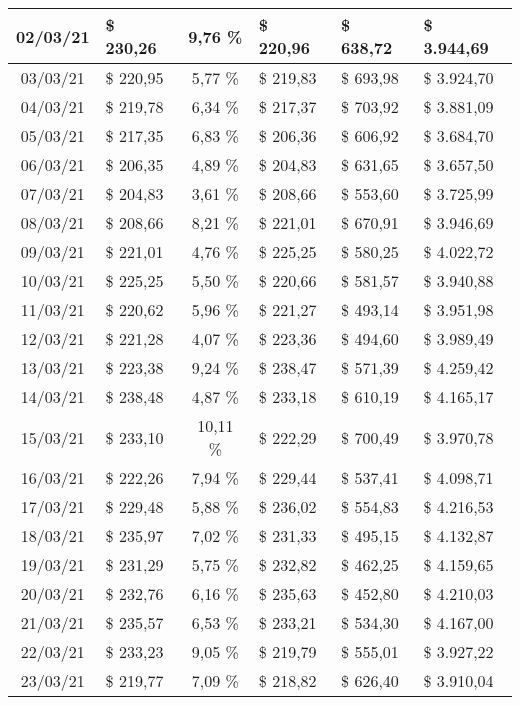 \begin{center}
\begin{small}
\begin{longtable}{|c|l|c|l|l|l|}
02/03/21 & \$ 230,26 & 9,76 \% & \$ 220,96 & \$ 638,72 & \$ 3.944,69 \\ \hline
03/03/21 & \$ 220,95 & 5,77 \% & \$ 219,83 & \$ 693,98 & \$ 3.924,70 \\ \hline
04/03/21 & \$ 219,78 & 6,34 \% & \$ 217,37 & \$ 703,92 & \$ 3.881,09 \\ \hline
05/03/21 & \$ 217,35 & 6,83 \% & \$ 206,36 & \$ 606,92 & \$ 3.684,70 \\ \hline
06/03/21 & \$ 206,35 & 4,89 \% & \$ 204,83 & \$ 631,65 & \$ 3.657,50 \\ \hline
07/03/21 & \$ 204,83 & 3,61 \% & \$ 208,66 & \$ 553,60 & \$ 3.725,99 \\ \hline
08/03/21 & \$ 208,66 & 8,21 \% & \$ 221,01 & \$ 670,91 & \$ 3.946,69 \\ \hline
09/03/21 & \$ 221,01 & 4,76 \% & \$ 225,25 & \$ 580,25 & \$ 4.022,72 \\ \hline
10/03/21 & \$ 225,25 & 5,50 \% & \$ 220,66 & \$ 581,57 & \$ 3.940,88 \\ \hline
11/03/21 & \$ 220,62 & 5,96 \% & \$ 221,27 & \$ 493,14 & \$ 3.951,98 \\ \hline
12/03/21 & \$ 221,28 & 4,07 \% & \$ 223,36 & \$ 494,60 & \$ 3.989,49 \\ \hline
13/03/21 & \$ 223,38 & 9,24 \% & \$ 238,47 & \$ 571,39 & \$ 4.259,42 \\ \hline
14/03/21 & \$ 238,48 & 4,87 \% & \$ 233,18 & \$ 610,19 & \$ 4.165,17 \\ \hline
15/03/21 & \$ 233,10 & 10,11 \% & \$ 222,29 & \$ 700,49 & \$ 3.970,78 \\ \hline
16/03/21 & \$ 222,26 & 7,94 \% & \$ 229,44 & \$ 537,41 & \$ 4.098,71 \\ \hline
17/03/21 & \$ 229,48 & 5,88 \% & \$ 236,02 & \$ 554,83 & \$ 4.216,53 \\ \hline
18/03/21 & \$ 235,97 & 7,02 \% & \$ 231,33 & \$ 495,15 & \$ 4.132,87 \\ \hline
19/03/21 & \$ 231,29 & 5,75 \% & \$ 232,82 & \$ 462,25 & \$ 4.159,65 \\ \hline
20/03/21 & \$ 232,76 & 6,16 \% & \$ 235,63 & \$ 452,80 & \$ 4.210,03 \\ \hline
21/03/21 & \$ 235,57 & 6,53 \% & \$ 233,21 & \$ 534,30 & \$ 4.167,00 \\ \hline
22/03/21 & \$ 233,23 & 9,05 \% & \$ 219,79 & \$ 555,01 & \$ 3.927,22 \\ \hline
23/03/21 & \$ 219,77 & 7,09 \% & \$ 218,82 & \$ 626,40 & \$ 3.910,04 \\ \hline

\end{longtable}
\end{small}
\end{center}
